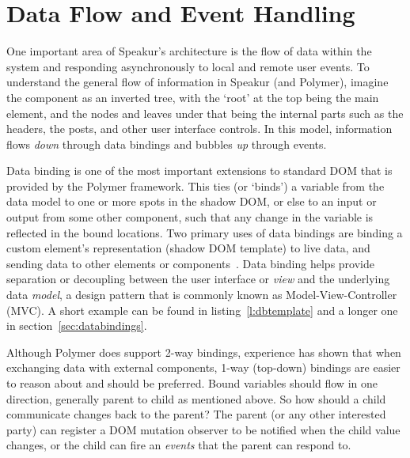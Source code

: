 
\section{Data Flow and Event Handling}
One important area of Speakur's architecture is the flow of data within the system and responding asynchronously to local and remote user events.
To understand the general flow of information in Speakur (and Polymer), imagine the component as an inverted tree, with the `root' at the top being the main  element, 
and the nodes and leaves under that being the internal parts such as the headers, the posts, and other user interface controls.
In this model, information flows \textit{down} through data bindings and bubbles \textit{up} through events.

Data binding is one of the most important extensions to standard DOM that is provided by the Polymer framework. 
This ties (or `binds') a variable from the data model to one or more spots in the shadow DOM, or else to an input or output from some other component, 
such that any change in the variable is reflected in the bound locations.
Two primary uses of data bindings are
binding a custom element's representation (shadow DOM template) to live data, 
and sending data to other elements or components~\cite{polymercontributors2015-b}. 
Data binding helps provide separation or decoupling between the user interface or \textit{view} and the underlying data \textit{model}, 
a design pattern that is commonly known as 
Model-View-Controller (MVC).
A short example can be found in listing~\ref{l:dbtemplate} and a longer one in section~\ref{sec:databindings}.

Although Polymer does support 2-way bindings, 
experience has shown that when exchanging data with external components, 1-way (top-down) bindings are easier to reason about and should be preferred.
Bound variables should flow in one direction, generally parent to child as mentioned above.
So how should a child communicate changes back to the parent? 
The parent (or any other interested party) can register a DOM mutation observer to be notified when the child value changes, or the child can fire an \textit{events} that the parent can respond to.

